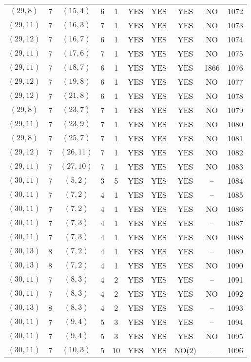 \begin{longtable}{|c|c|c|c|c|c|c|c|c|c|}
$(29, 8)$ & 7 & $(15, 4)$ & 6 & 1 & YES & YES & YES & NO & 1072\\
$(29, 11)$ & 7 & $(16, 3)$ & 7 & 1 & YES & YES & YES & NO & 1073\\
$(29, 12)$ & 7 & $(16, 7)$ & 6 & 1 & YES & YES & YES & NO & 1074\\
$(29, 11)$ & 7 & $(17, 6)$ & 7 & 1 & YES & YES & YES & NO & 1075\\
$(29, 11)$ & 7 & $(18, 7)$ & 6 & 1 & YES & YES & YES & 1866 & 1076\\
$(29, 12)$ & 7 & $(19, 8)$ & 6 & 1 & YES & YES & YES & NO & 1077\\
$(29, 12)$ & 7 & $(21, 8)$ & 6 & 1 & YES & YES & YES & NO & 1078\\
$(29, 8)$ & 7 & $(23, 7)$ & 7 & 1 & YES & YES & YES & NO & 1079\\
$(29, 11)$ & 7 & $(23, 9)$ & 7 & 1 & YES & YES & YES & NO & 1080\\
$(29, 8)$ & 7 & $(25, 7)$ & 7 & 1 & YES & YES & YES & NO & 1081\\
$(29, 12)$ & 7 & $(26, 11)$ & 7 & 1 & YES & YES & YES & NO & 1082\\
$(29, 11)$ & 7 & $(27, 10)$ & 7 & 1 & YES & YES & YES & NO & 1083\\
$(30, 11)$ & 7 & $(5, 2)$ & 3 & 5 & YES & YES & YES & -- & 1084\\
$(30, 11)$ & 7 & $(7, 2)$ & 4 & 1 & YES & YES & YES & -- & 1085\\
$(30, 11)$ & 7 & $(7, 2)$ & 4 & 1 & YES & YES & YES & NO & 1086\\
$(30, 11)$ & 7 & $(7, 3)$ & 4 & 1 & YES & YES & YES & -- & 1087\\
$(30, 11)$ & 7 & $(7, 3)$ & 4 & 1 & YES & YES & YES & NO & 1088\\
$(30, 13)$ & 8 & $(7, 2)$ & 4 & 1 & YES & YES & YES & -- & 1089\\
$(30, 13)$ & 8 & $(7, 2)$ & 4 & 1 & YES & YES & YES & NO & 1090\\
$(30, 11)$ & 7 & $(8, 3)$ & 4 & 2 & YES & YES & YES & -- & 1091\\
$(30, 11)$ & 7 & $(8, 3)$ & 4 & 2 & YES & YES & YES & NO & 1092\\
$(30, 13)$ & 8 & $(8, 3)$ & 4 & 2 & YES & YES & YES & -- & 1093\\
$(30, 11)$ & 7 & $(9, 4)$ & 5 & 3 & YES & YES & YES & -- & 1094\\
$(30, 11)$ & 7 & $(9, 4)$ & 5 & 3 & YES & YES & YES & NO & 1095\\
$(30, 11)$ & 7 & $(10, 3)$ & 5 & 10 & YES & YES & NO(2) & -- & 1096\\

\end{longtable}
